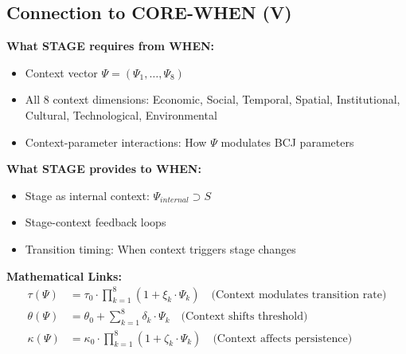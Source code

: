 \subsection{Connection to CORE-WHEN (V)}

\begin{tcolorbox}[colback=blue!5!white, colframe=blue!75!black,
    title=Integration: STAGE $\leftrightarrow$ WHEN]

\textbf{What STAGE requires from WHEN:}
\begin{itemize}[nosep]
\item Context vector $\Psi = (\Psi_1, \ldots, \Psi_8)$
\item All 8 context dimensions: Economic, Social, Temporal, Spatial, Institutional, Cultural, Technological, Environmental
\item Context-parameter interactions: How $\Psi$ modulates BCJ parameters
\end{itemize}

\textbf{What STAGE provides to WHEN:}
\begin{itemize}[nosep]
\item Stage as internal context: $\Psi_{internal} \supset S$
\item Stage-context feedback loops
\item Transition timing: When context triggers stage changes
\end{itemize}

\textbf{Mathematical Links:}
\begin{align}
\tau(\Psi) &= \tau_0 \cdot \prod_{k=1}^{8} (1 + \xi_k \cdot \Psi_k) \quad \text{(Context modulates transition rate)} \\
\theta(\Psi) &= \theta_0 + \sum_{k=1}^{8} \delta_k \cdot \Psi_k \quad \text{(Context shifts threshold)} \\
\kappa(\Psi) &= \kappa_0 \cdot \prod_{k=1}^{8} (1 + \zeta_k \cdot \Psi_k) \quad \text{(Context affects persistence)}
\end{align}


\end{tcolorbox}
